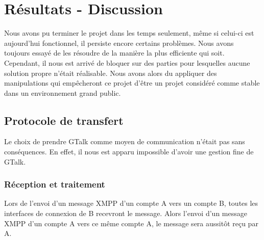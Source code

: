 \cleardoublepage



\chapter{Résultats - Discussion}

Nous avons pu terminer le projet dans les temps seulement, même si celui-ci est aujourd'hui fonctionnel, il persiste encore certains problèmes.
Nous avons toujours essayé de les résoudre de la manière la plus efficiente qui soit.
Cependant, il nous est arrivé de bloquer sur des parties pour lesquelles aucune solution propre n'était réalisable.
Nous avons alors du appliquer des manipulations qui empêcheront ce projet d'être un projet considéré comme stable dans un environnement grand public.






\section{Protocole de transfert}

Le choix de prendre GTalk comme moyen de communication n'était pas sans conséquences.
En effet, il nous est apparu impossible d'avoir une gestion fine de GTalk.




\subsection{Réception et traitement}

Lors de l'envoi d'un message XMPP d'un compte A vers un compte B, toutes les interfaces de connexion de B recevront le message.
Alors l'envoi d'un message XMPP d'un compte A vers ce même compte A, le message sera aussitôt reçu par A.

